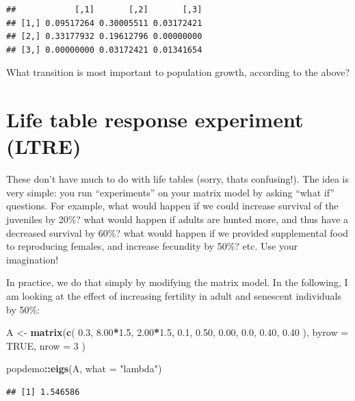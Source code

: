 \documentclass[
  a4paper]{book}
\newenvironment{Shaded}{\begin{snugshade}}{\end{snugshade}}
\newcommand{\AttributeTok}[1]{\textcolor[rgb]{0.13,0.29,0.53}{#1}}
\newcommand{\ConstantTok}[1]{\textcolor[rgb]{0.56,0.35,0.01}{#1}}
\newcommand{\DecValTok}[1]{\textcolor[rgb]{0.00,0.00,0.81}{#1}}
\newcommand{\FloatTok}[1]{\textcolor[rgb]{0.00,0.00,0.81}{#1}}
\newcommand{\FunctionTok}[1]{\textcolor[rgb]{0.13,0.29,0.53}{\textbf{#1}}}
\newcommand{\NormalTok}[1]{#1}
\newcommand{\OtherTok}[1]{\textcolor[rgb]{0.56,0.35,0.01}{#1}}
\newcommand{\SpecialCharTok}[1]{\textcolor[rgb]{0.81,0.36,0.00}{\textbf{#1}}}
\newcommand{\StringTok}[1]{\textcolor[rgb]{0.31,0.60,0.02}{#1}}
\begin{document}
\begin{verbatim}
##            [,1]       [,2]       [,3]
## [1,] 0.09517264 0.30005511 0.03172421
## [2,] 0.33177932 0.19612796 0.00000000
## [3,] 0.00000000 0.03172421 0.01341654
\end{verbatim}

What transition is most important to population growth, according to the above?

\hypertarget{life-table-response-experiment-ltre}{%
\section{Life table response experiment (LTRE)}\label{life-table-response-experiment-ltre}}

These don't have much to do with life tables (sorry, thats confusing!). The idea is very simple: you run ``experiments'' on your matrix model by asking ``what if'' questions. For example, what would happen if we could increase survival of the juveniles by 20\%? what would happen if adults are hunted more, and thus have a decreased survival by 60\%? what would happen if we provided supplemental food to reproducing females, and increase fecundity by 50\%? etc. Use your imagination!

In practice, we do that simply by modifying the matrix model. In the following, I am looking at the effect of increasing fertility in adult and senescent individuals by 50\%:

\begin{Shaded}
\begin{Highlighting}[]
\NormalTok{A }\OtherTok{\textless{}{-}} \FunctionTok{matrix}\NormalTok{(}\FunctionTok{c}\NormalTok{(}
  \FloatTok{0.3}\NormalTok{, }\FloatTok{8.00}\SpecialCharTok{*}\FloatTok{1.5}\NormalTok{, }\FloatTok{2.00}\SpecialCharTok{*}\FloatTok{1.5}\NormalTok{,}
  \FloatTok{0.1}\NormalTok{, }\FloatTok{0.50}\NormalTok{, }\FloatTok{0.00}\NormalTok{,}
  \FloatTok{0.0}\NormalTok{, }\FloatTok{0.40}\NormalTok{, }\FloatTok{0.40}
\NormalTok{),}
\AttributeTok{byrow =} \ConstantTok{TRUE}\NormalTok{, }\AttributeTok{nrow =} \DecValTok{3}
\NormalTok{)}

\NormalTok{popdemo}\SpecialCharTok{::}\FunctionTok{eigs}\NormalTok{(A, }\AttributeTok{what =} \StringTok{"lambda"}\NormalTok{)}
\end{Highlighting}
\end{Shaded}

\begin{verbatim}
## [1] 1.546586
\end{verbatim}
\end{document}
